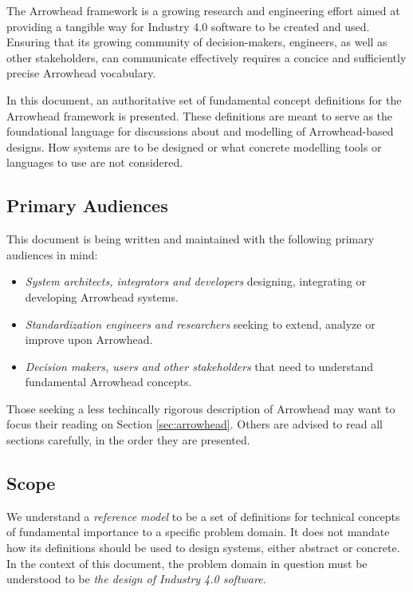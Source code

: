 %
%

The Arrowhead framework is a growing research and engineering effort aimed at providing a tangible way for Industry 4.0 software to be created and used.
Ensuring that its growing community of decision-makers, engineers, as well as other stakeholders, can communicate effectively requires a concice and sufficiently precise Arrowhead vocabulary.

In this document, an authoritative set of fundamental concept definitions for the Arrowhead framework is presented.
These definitions are meant to serve as the foundational language for discussions about and modelling of Arrowhead-based designs.
How systems are to be designed or what concrete modelling tools or languages to use are not considered.

\subsection{Primary Audiences}
\label{sec:introduction:audiences}

This document is being written and maintained with the following primary audiences in mind:

\begin{itemize}
\item \textit{System architects, integrators and developers} designing, integrating or developing Arrowhead systems.
\item \textit{Standardization engineers and researchers} seeking to extend, analyze or improve upon Arrowhead.
\item \textit{Decision makers, users and other stakeholders} that need to understand fundamental Arrowhead concepts.
\end{itemize}

Those seeking a less techincally rigorous description of Arrowhead may want to focus their reading on Section \ref{sec:arrowhead}.
Others are advised to read all sections carefully, in the order they are presented.

\subsection{Scope}

We understand a \textit{reference model} to be a set of definitions for technical concepts of fundamental importance to a specific problem domain.
It does not mandate how its definitions should be used to design systems, either abstract or concrete.
In the context of this document, the problem domain in question must be understood to be \textit{the design of Industry 4.0 software}.

